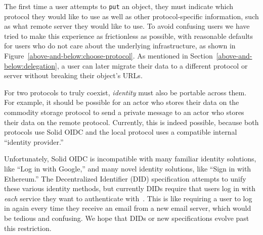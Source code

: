 The first time a user attempts to \texttt{put} an object,
they must indicate which protocol they would like to use
as well as other protocol-specific information, such as what
remote server they would like to use.
To avoid confusing users we have tried to make this experience
as frictionless as possible, with reasonable defaults for
users who do not care about the underlying infrastructure,
as shown in Figure~\ref{above-and-below:choose-protocol}.
As mentioned in Section~\ref{above-and-below:delegation},
a user can later migrate their data to a different protocol
or server without breaking their object's URLs.

For two protocols to truly coexist,
\emph{identity} must also be portable across them.
For example, it should be possible for an actor who stores their data on
the commodity storage protocol to send a private message to an
actor who stores their data on the remote protocol.
Currently, this is indeed possible, because both protocols use Solid OIDC
and the local protocol uses a compatible internal ``identity provider.''

Unfortunately, Solid OIDC is incompatible with many familiar
identity solutions, like ``Log in with Google,''
and many novel identity solutions, like ``Sign in with Ethereum.''
The Decentralized Identifier (DID) specification attempts to unify
these various identity methods, but currently DIDs require that
users log in with \emph{each} service they want to authenticate with~\cite{dids}.
This is like requiring a user to log in again every time
they receive an email from a new email server, which would
be tedious and confusing.
We hope that DIDs or new specifications evolve past this restriction.





